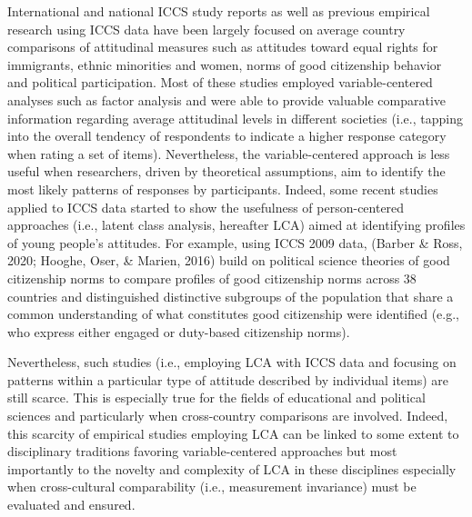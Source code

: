 \documentclass[12pt,a4paper,oneside]{reedthesis}
\begin{document}
International and national ICCS study reports as well as previous empirical research using ICCS data have been largely focused on average country comparisons of attitudinal measures such as attitudes toward equal rights for immigrants, ethnic minorities and women, norms of good citizenship behavior and political participation. Most of these studies employed variable-centered analyses such as factor analysis and were able to provide valuable comparative information regarding average attitudinal levels in different societies (i.e., tapping into the overall tendency of respondents to indicate a higher response category when rating a set of items). Nevertheless, the variable-centered approach is less useful when researchers, driven by theoretical assumptions, aim to identify the most likely patterns of responses by participants. Indeed, some recent studies applied to ICCS data started to show the usefulness of person-centered approaches (i.e., latent class analysis, hereafter LCA) aimed at identifying profiles of young people's attitudes. For example, using ICCS 2009 data, (Barber \& Ross, 2020; Hooghe, Oser, \& Marien, 2016) build on political science theories of good citizenship norms to compare profiles of good citizenship norms across 38 countries and distinguished distinctive subgroups of the population that share a common understanding of what constitutes good citizenship were identified (e.g., who express either engaged or duty-based citizenship norms).

Nevertheless, such studies (i.e., employing LCA with ICCS data and focusing on patterns within a particular type of attitude described by individual items) are still scarce. This is especially true for the fields of educational and political sciences and particularly when cross-country comparisons are involved. Indeed, this scarcity of empirical studies employing LCA can be linked to some extent to disciplinary traditions favoring variable-centered approaches but most importantly to the novelty and complexity of LCA in these disciplines especially when cross-cultural comparability (i.e., measurement invariance) must be evaluated and ensured.
\end{document}
